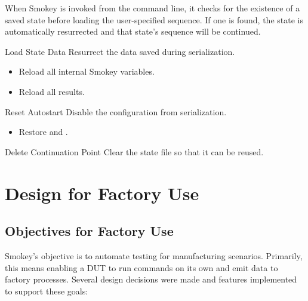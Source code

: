 When Smokey is invoked from the command line, it checks for the existence of a
saved state before loading the user-specified sequence.  If one is found, the
state is automatically resurrected and that state's sequence will be continued.

\begin{Definition}

\item[Load State Data] Resurrect the data saved during serialization.

	\begin{itemize}

	\item Reload all internal Smokey variables.

	\item Reload all results.

	\end{itemize}

\item[Reset Autostart] Disable the configuration from serialization.

	\begin{itemize}

	\item Restore  and .

	\end{itemize}

\item[Delete Continuation Point] Clear the state file so that it can be reused.

\end{Definition}


\section{Design for Factory Use}

\subsection{Objectives for Factory Use}

Smokey's objective is to automate testing for manufacturing scenarios.
Primarily, this means enabling a DUT to run commands on its own and emit data
to factory processes.  Several design decisions were made and features
implemented to support these goals:

